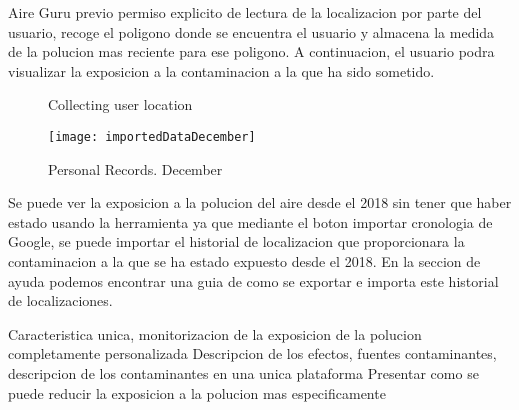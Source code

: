 Aire Guru previo permiso explicito de lectura de la localizacion por parte del usuario, recoge el poligono donde
se encuentra el usuario y almacena la medida de la polucion mas reciente para ese poligono. A continuacion, el 
usuario podra visualizar la exposicion a la contaminacion a la que ha sido sometido.

\begin{figure}[ht]
    \centering 
      \caption{Collecting user location}
    \end{figure}
    \newpage
    \begin{figure}[ht]
        \centering
        \texttt{[image: importedDataDecember]}
        \caption{Personal Records. December}
    \end{figure}

Se puede ver la exposicion a la polucion del aire desde el 2018 sin tener que haber estado usando la herramienta ya que
mediante el boton importar cronologia de Google, se puede importar el historial de localizacion que proporcionara la
contaminacion a la que se ha estado expuesto desde el 2018. En la seccion de ayuda podemos encontrar una guia de como se 
exportar e importa este historial de localizaciones.
\begin{comment}
    

\begin{figure}[ht]
    \centering
    \texttt{[image: helpImport]}
    \caption{First step Import Google Location}
\end{figure}
\end{comment}
\begin{itemize}
    \done Caracteristica unica, monitorizacion de la exposicion de la polucion completamente personalizada
    \done Descripcion de los efectos, fuentes contaminantes, descripcion de los contaminantes en una unica plataforma
    \crossed Presentar como se puede reducir la exposicion a la polucion mas especificamente
    
\end{itemize}
\newpage